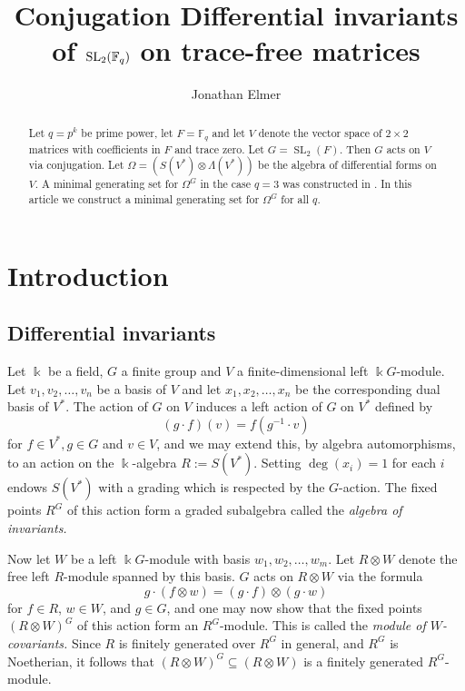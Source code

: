 \documentclass[a4paper]{amsart}
\title{Conjugation Differential invariants of $\SL_2(\F_q)$ on trace-free matrices}
\author{Jonathan Elmer}
\newcommand{\F}{\mathbb{F}}
\newcommand{\kk}{\Bbbk}
\def\SL{\operatorname{SL}}
\newtheorem*{Corollary of Conjecture}{Corollary of Conjecture}
\theoremstyle{definition}
\theoremstyle{remark}
\theoremstyle{Acknowledgments}
\begin{document}
\maketitle

\begin{abstract}
Let $q = p^k$ be  prime power, let $F = \F_q$ and let $V$ denote the vector space of $2 \times 2$ matrices with coefficients in $F$ and trace zero. Let $G = \SL_2(F)$. Then $G$ acts on $V$ via conjugation. Let $\Omega =(S(V^*) \otimes \Lambda(V^*))$ be the algebra of differential forms on $V$. A minimal generating set for $\Omega^G$ in the case $q=3$ was constructed in \cite{ElmerMeyer}. In this article we construct a minimal generating set for $\Omega^G$ for all $q$. 
\end{abstract}




\section{Introduction}
\subsection{Differential invariants}\label{sec:diffinv}

Let $\kk$ be a field, $G$ a finite group and $V$ a finite-dimensional left $\kk G$-module. Let $v_1,v_2, \ldots, v_n$ be a basis of $V$ and let $x_1,x_2, \ldots, x_n$ be the corresponding dual basis of $V^*$. The action of $G$ on $V$ induces a left action of $G$ on $V^*$ defined by
\[(g \cdot f)(v) = f(g^{-1} \cdot v)\]
for $f \in V^*, g \in G$ and $v \in V$, and we may extend this, by algebra automorphisms, to an action on the $\kk$-algebra $R:=S(V^*)$. Setting $\deg(x_i)=1$ for each $i$ endows $S(V^*)$ with a grading which is respected by the $G$-action. 
The fixed points $R^G$ of this action form a graded subalgebra called the {\it algebra of invariants.}

Now let $W$ be a left $\kk G$-module with basis $w_1, w_2, \ldots, w_m$. Let $R \otimes W$ denote the free left $R$-module spanned by this basis. $G$ acts on $R \otimes W$ via the formula
\[g \cdot (f \otimes w)  = (g \cdot f) \otimes (g \cdot w)\] for $f \in R$, $w \in W$, and $g \in G$, and one may now show that the fixed points $(R \otimes W)^G$ of this action form an $R^G$-module. This is called the {\it module of $W$-covariants.} Since $R$ is finitely generated over $R^G$ in general, and $R^G$ is Noetherian, it follows that $(R \otimes W)^G \subseteq (R \otimes W)$ is a finitely generated $R^G$-module.
\end{document}
